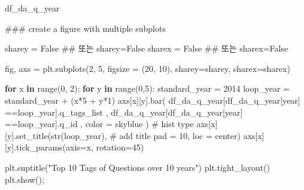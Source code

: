\documentclass[
  letterpaper,
  DIV=11,
  numbers=noendperiod]{scrartcl}
\newenvironment{Shaded}{\begin{snugshade}}{\end{snugshade}}
\newcommand{\BuiltInTok}[1]{\textcolor[rgb]{0.00,0.23,0.31}{#1}}
\newcommand{\CommentTok}[1]{\textcolor[rgb]{0.37,0.37,0.37}{#1}}
\newcommand{\ControlFlowTok}[1]{\textcolor[rgb]{0.00,0.23,0.31}{\textbf{#1}}}
\newcommand{\DecValTok}[1]{\textcolor[rgb]{0.68,0.00,0.00}{#1}}
\newcommand{\KeywordTok}[1]{\textcolor[rgb]{0.00,0.23,0.31}{\textbf{#1}}}
\newcommand{\NormalTok}[1]{\textcolor[rgb]{0.00,0.23,0.31}{#1}}
\newcommand{\OperatorTok}[1]{\textcolor[rgb]{0.37,0.37,0.37}{#1}}
\newcommand{\StringTok}[1]{\textcolor[rgb]{0.13,0.47,0.30}{#1}}
\newcommand{\VariableTok}[1]{\textcolor[rgb]{0.07,0.07,0.07}{#1}}
\begin{document}
\begin{Shaded}
\begin{Highlighting}[]
\NormalTok{df\_da\_q\_year}
\end{Highlighting}
\end{Shaded}

\begin{Shaded}
\begin{Highlighting}[]
\CommentTok{\#\#\# create a figure with multiple subplots}


\NormalTok{sharey }\OperatorTok{=} \VariableTok{False} \CommentTok{\#\# 또는 sharey=False}
\NormalTok{sharex }\OperatorTok{=} \VariableTok{False} \CommentTok{\#\# 또는 sharex=False}

\NormalTok{fig, axs }\OperatorTok{=}\NormalTok{ plt.subplots(}\DecValTok{2}\NormalTok{, }\DecValTok{5}\NormalTok{, figsize }\OperatorTok{=}\NormalTok{ (}\DecValTok{20}\NormalTok{, }\DecValTok{10}\NormalTok{), sharey}\OperatorTok{=}\NormalTok{sharey, sharex}\OperatorTok{=}\NormalTok{sharex)}

\ControlFlowTok{for}\NormalTok{ x }\KeywordTok{in} \BuiltInTok{range}\NormalTok{(}\DecValTok{0}\NormalTok{, }\DecValTok{2}\NormalTok{):}
    \ControlFlowTok{for}\NormalTok{ y }\KeywordTok{in} \BuiltInTok{range}\NormalTok{(}\DecValTok{0}\NormalTok{,}\DecValTok{5}\NormalTok{):}
\NormalTok{        standard\_year }\OperatorTok{=} \DecValTok{2014}
\NormalTok{        loop\_year }\OperatorTok{=}\NormalTok{ standard\_year }\OperatorTok{+}\NormalTok{ (x}\OperatorTok{*}\DecValTok{5} \OperatorTok{+}\NormalTok{ y}\OperatorTok{*}\DecValTok{1}\NormalTok{)}
\NormalTok{        axs[x][y].bar( df\_da\_q\_year[df\_da\_q\_year[}\StringTok{\textquotesingle{}year\textquotesingle{}}\NormalTok{] }\OperatorTok{==}\NormalTok{loop\_year].q\_tags\_list}
\NormalTok{                    ,  df\_da\_q\_year[df\_da\_q\_year[}\StringTok{\textquotesingle{}year\textquotesingle{}}\NormalTok{] }\OperatorTok{==}\NormalTok{loop\_year].q\_id}
\NormalTok{                    ,  color }\OperatorTok{=} \StringTok{\textquotesingle{}skyblue\textquotesingle{}}
\NormalTok{                ) }\CommentTok{\# hist type}
\NormalTok{        axs[x][y].set\_title(}\BuiltInTok{str}\NormalTok{(loop\_year), }\CommentTok{\# add title}
\NormalTok{             pad }\OperatorTok{=} \DecValTok{10}\NormalTok{,}
\NormalTok{             loc }\OperatorTok{=} \StringTok{\textquotesingle{}center\textquotesingle{}}\NormalTok{)}
\NormalTok{        axs[x][y].tick\_params(axis}\OperatorTok{=}\StringTok{\textquotesingle{}x\textquotesingle{}}\NormalTok{, rotation}\OperatorTok{=}\DecValTok{45}\NormalTok{)}


 
\NormalTok{plt.suptitle(}\StringTok{"Top 10 Tags of Questions over 10 years"}\NormalTok{)      }
\NormalTok{plt.tight\_layout()    }
\NormalTok{plt.show()}\OperatorTok{;}
\end{Highlighting}
\end{Shaded}
\end{document}
